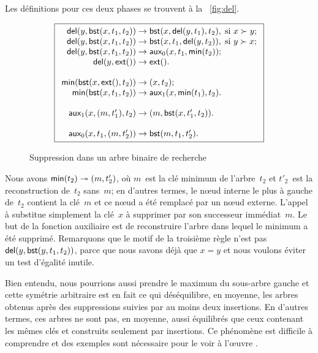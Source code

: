Les définitions pour ces deux phases se trouvent à la
\fig~\vref{fig:del}.
\begin{figure}[!b]
\begin{equation*}
\boxed{
\begin{array}{r@{\;}l@{\;}l}
  \fun{del}(y,\fun{bst}(x,t_1,t_2)) & \rightarrow &
  \fun{bst}(x,\fun{del}(y,t_1),t_2),\; \text{si \(x \succ y\)};\\
\fun{del}(y,\fun{bst}(x,t_1,t_2)) & \rightarrow &
  \fun{bst}(x,t_1,\fun{del}(y,t_2)),\; \text{si \(y \succ x\)};\\
\fun{del}(y,\fun{bst}(x,t_1,t_2)) & \rightarrow &
   \fun{aux}_0(x,t_1,\fun{min}(t_2));\\
\fun{del}(y,\fun{ext}()) & \rightarrow & \fun{ext}().\\
\\
\fun{min}(\fun{bst}(x,\fun{ext}(),t_2)) & \rightarrow & \pair{x}{t_2};\\
\fun{min}(\fun{bst}(x,t_1,t_2)) & \rightarrow &
  \fun{aux}_1(x,\fun{min}(t_1),t_2).\\
\\
\fun{aux}_1(x,\pair{m}{t'_1},t_2) & \rightarrow &
  \pair{m}{\fun{bst}(x,t'_1,t_2)}.\\
\\
\fun{aux}_0(x,t_1,\pair{m}{t'_2}) & \rightarrow & \fun{bst}(m,t_1,t'_2).
\end{array}}
\end{equation*}
\caption{Suppression dans un arbre binaire de recherche\label{fig:del}}
\end{figure}
Nous avons \(\textsf{min}(t_2) \twoheadrightarrow
({m},{t'_2})\), où \(m\)~est la clé minimum
de l'arbre~\(t_2\) et \(t'_2\)~est la reconstruction de~\(t_2\)
sans~\(m\); en d'autres termes, le n{\oe}ud interne le plus à gauche
de~\(t_2\) contient la clé~\(m\) et ce n{\oe}ud a été remplacé par un
n{\oe}ud externe. L'appel à  substitue simplement la
clé~\(x\) à supprimer par son successeur immédiat~\(m\). Le but de la
fonction auxiliaire  est de reconstruire l'arbre dans
lequel le minimum a été supprimé. Remarquons que le motif de la
troisième règle n'est pas \(\textsf{del}(y,
\textsf{bst}(y,t_1,t_2))\), parce que nous savons
déjà que \(x=y\) et nous voulons éviter un test d'égalité inutile.

Bien entendu, nous pourrions aussi prendre le maximum du sous-arbre
gauche et cette symétrie arbitraire est en fait ce qui déséquilibre,
en moyenne, les arbres obtenus après des suppressions suivies par au
moins deux insertions. En d'autres termes, ces arbres ne sont pas, en
moyenne, aussi équilibrés que ceux contenant les mêmes clés et
construits seulement par insertions. Ce phénomène est difficile à
comprendre et des exemples sont nécessaire pour le voir à l'{\oe}uvre
\citep{Eppinger_1983,CulbersonMunro_1989,CulbersonEvans_1994,Knuth_1998a,Heyer_2009}.

